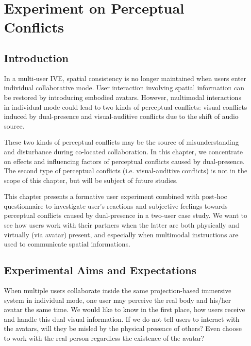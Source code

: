 \chapter{Experiment on Perceptual Conflicts}
\label{chapter:expe_perception}
\pagebreak

\minitoc

\newpage
\section{Introduction}
In a multi-user IVE, spatial consistency is no longer maintained when users enter individual collaborative mode. User interaction involving spatial information can be restored by introducing embodied avatars. However, multimodal interactions in individual mode could lead to two kinds of perceptual conflicts: visual conflicts induced by dual-presence and visual-auditive conflicts due to the shift of audio source.

These two kinds of perceptual conflicts may be the source of misunderstanding and disturbance during co-located collaboration. In this chapter, we concentrate on effects and influencing factors of perceptual conflicts caused by dual-presence. The second type of perceptual conflicts (i.e. visual-auditive conflicts) is not in the scope of this chapter, but will be subject of future studies.

This chapter presents a formative user experiment combined with post-hoc questionnaire to investigate user's reactions and subjective feelings towards perceptual conflicts caused by dual-presence in a two-user case study. We want to see how users work with their partners when the latter are both physically and virtually (via avatar) present, and especially when multimodal instructions are used to communicate spatial informations.


\section{Experimental Aims and Expectations}
When multiple users collaborate inside the same projection-based immersive system in individual mode, one user may perceive the real body and his/her avatar the same time. We would like to know in the first place, how users receive and handle this dual visual information. If we do not tell users to interact with the avatars, will they be misled by the physical presence of others? Even choose to work with the real person regardless the existence of the avatar?

